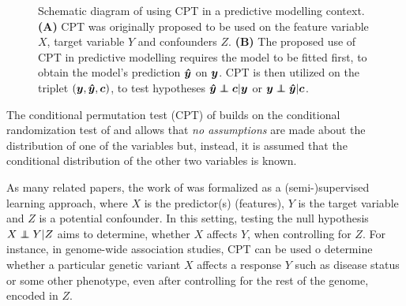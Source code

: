 \documentclass{article}
\begin{document}
\begin{figure}
{

    }
  \caption{Schematic diagram of using CPT in a predictive modelling context. \\ \textbf{(A)} CPT was originally proposed to be used on the feature variable $X$, target variable $Y$ and confounders $Z$. \textbf{(B)} The proposed use of CPT in predictive modelling requires the model to be fitted first, to obtain the model's prediction $\boldsymbol{\hat{y}}$ on $\boldsymbol{y}$. CPT is then utilized on the triplet $(\boldsymbol{y}, \boldsymbol{\hat{y}}, \boldsymbol{c})$, to test hypotheses $\yhat \independent \c | \y$ or $\y \independent \yhat | \c$.}
  \label{fig:schematic}
\end{figure}



The conditional permutation test (CPT) of \cite{berrett2020conditional} builds on the conditional randomization test of \cite{candes2016panning} and allows that \emph{no assumptions} are made about the distribution of one of the variables but, instead, it is assumed that the conditional distribution of the other two variables is known.

As many related papers, the work of \cite{berrett2020conditional} was formalized as a (semi-)supervised learning approach, where $X$ is the predictor(s) (features), $Y$ is the target variable and $Z$ is a potential confounder. In this setting, testing the null hypothesis $X \independent Y | Z$ aims to determine, whether $X$ affects $Y$, when controlling for $Z$.
For instance, in genome-wide association studies, CPT can be used o determine whether a particular genetic variant $X$ affects a response $Y$ such as disease status or some other phenotype, even after controlling for the rest of the genome, encoded in $Z$.
\end{document}
